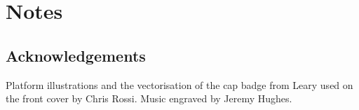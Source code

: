 \part{Notes}

\chapter{Acknowledgements}

Platform illustrations and the vectorisation of the cap badge from Leary used on the front cover by Chris Rossi. Music engraved by Jeremy Hughes.



